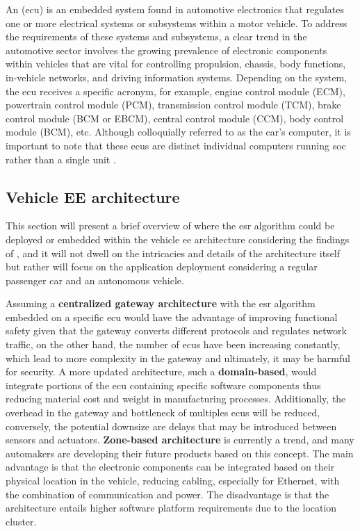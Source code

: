 An  (\gls{ecu}) is an embedded system found in automotive electronics that regulates one or more electrical systems or subsystems within a motor vehicle. To address the requirements of these systems and subsystems, a clear trend in the automotive sector involves the growing prevalence of electronic components within vehicles that are vital for controlling propulsion, chassis, body functions, in-vehicle networks, and driving information systems. Depending on the system, the \gls{ecu} receives a specific acronym, for example, engine control module (ECM), powertrain control module (PCM), transmission control module (TCM), brake control module (BCM or EBCM), central control module (CCM), body control module (BCM), etc. Although colloquially referred to as the car's computer, it is important to note that these \gls{ecu}s are distinct individual computers running \gls{soc} rather than a single unit \cite{Aptiv2020}.


\subsection{Vehicle EE architecture}
\label{subsec:ECU_common_units_in_market}

This section will present a brief overview of where the \gls{esr} algorithm could be deployed or embedded within the vehicle \gls{ee} architecture considering the findings of \textcite{Zhu2021}, and it will not dwell on the intricacies and details of the architecture itself but rather will focus on the application deployment considering a regular passenger car and an autonomous vehicle.

Assuming a \textbf{centralized gateway architecture} with the \gls{esr} algorithm embedded on a specific \gls{ecu} would have the advantage of improving functional safety given that the gateway converts different protocols and regulates network traffic, on the other hand,  the number of \gls{ecu}s have been increasing constantly, which lead to more complexity in the gateway and ultimately, it may be harmful for security. A more updated architecture, such a \textbf{domain-based}, would integrate portions of the \gls{ecu} containing specific software components thus reducing material cost and weight in manufacturing processes. Additionally, the overhead in the gateway and bottleneck of multiples \gls{ecu}s will be reduced, conversely, the potential downsize are delays that may be introduced between sensors and actuators. \textbf{Zone-based architecture} is currently a trend, and many automakers are developing their future products based on this concept. The main advantage is that the electronic components can be integrated based on their physical location in the vehicle, reducing cabling, especially for Ethernet, with the combination of communication and power. The disadvantage is that the architecture entails higher software platform requirements due to the location cluster.

